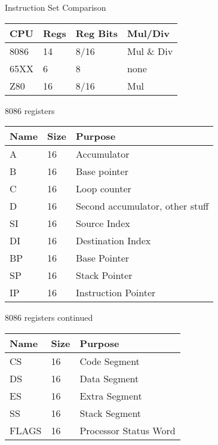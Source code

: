 \documentclass[aspectratio=43]{uva-inf-presentation}
\begin{document}

\begin{frame}{Instruction Set Comparison}

\begin{tabular}{|l|l|l|l|}
\hline CPU & Regs & Reg Bits & Mul/Div \\ \hline
8086 & 14 & 8/16 & Mul \& Div \\
65XX & 6 & 8 & none \\
Z80 & 16 & 8/16 & Mul \\ \hline
\end{tabular}

\end{frame}


\begin{frame}{8086 registers}

\begin{tabular}{|l|l|l|}
\hline Name & Size & Purpose \\ \hline
A & 16 & Accumulator \\
B & 16 & Base pointer \\
C & 16 & Loop counter \\
D & 16 & Second accumulator, other stuff \\ 
SI & 16 & Source Index \\
DI & 16 & Destination Index \\
BP & 16 & Base Pointer \\
SP & 16 & Stack Pointer \\
IP & 16 & Instruction Pointer \\ \hline
\end{tabular}

\end{frame}


\begin{frame}{8086 registers continued}

\begin{tabular}{|l|l|l|}
\hline Name & Size & Purpose \\ \hline
CS & 16 & Code Segment \\
DS & 16 & Data Segment \\
ES & 16 & Extra Segment \\
SS & 16 & Stack Segment \\
FLAGS & 16 & Processor Status Word \\ \hline
\end{tabular}

\end{frame}
\end{document}
